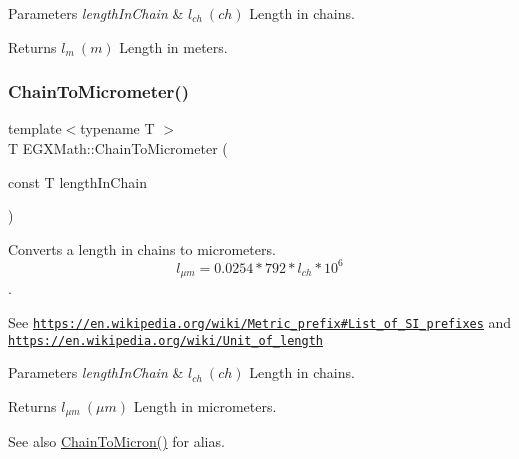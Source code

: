 \begin{DoxyParams}{Parameters}
{\em length\+In\+Chain} & $ l_{ch}\ (ch)$ Length in chains. \\
\hline
\end{DoxyParams}
\begin{DoxyReturn}{Returns}
$ l_{m}\ (m)$ Length in meters. 
\end{DoxyReturn}
\mbox{\label{group___e_g_x_math-_conversions-_length_conversions-_imperial-_chain-_s_i_gab6d1ab0738e0a31f328352569fa00767}} 
\subsubsection{\texorpdfstring{Chain\+To\+Micrometer()}{ChainToMicrometer()}}
{\footnotesize\ttfamily template$<$typename T $>$ \\
T E\+G\+X\+Math\+::\+Chain\+To\+Micrometer (\begin{DoxyParamCaption}\item[{const T}]{length\+In\+Chain }\end{DoxyParamCaption})}



Converts a length in chains to micrometers. \[ l_{\mu m}=0.0254 * 792 * l_{ch} * 10^{6} \]. 

See \href{https://en.wikipedia.org/wiki/Metric_prefix#List_of_SI_prefixes}{\tt https\+://en.\+wikipedia.\+org/wiki/\+Metric\+\_\+prefix\#\+List\+\_\+of\+\_\+\+S\+I\+\_\+prefixes} and \href{https://en.wikipedia.org/wiki/Unit_of_length}{\tt https\+://en.\+wikipedia.\+org/wiki/\+Unit\+\_\+of\+\_\+length} 
\begin{DoxyParams}{Parameters}
{\em length\+In\+Chain} & $ l_{ch}\ (ch)$ Length in chains. \\
\hline
\end{DoxyParams}
\begin{DoxyReturn}{Returns}
$ l_{\mu m}\ (\mu m)$ Length in micrometers. 
\end{DoxyReturn}
\begin{DoxySeeAlso}{See also}
\mbox{\hyperlink{group___e_g_x_math-_conversions-_length_conversions-_imperial-_chain-_non-_s_i_ga9efe9ceb0ab30639026cbb4158bb0148}{Chain\+To\+Micron()}} for alias. 
\end{DoxySeeAlso}
\mbox{\label{group___e_g_x_math-_conversions-_length_conversions-_imperial-_chain-_s_i_gab2a17c49dbe6d8ec546e8819de2df33b}} 
